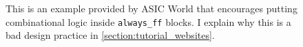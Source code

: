 
\begin{figure}[t]
    \centering
    \caption[
        ASIC World bad example
    ]{
        This is an example provided by ASIC World that encourages putting combinational logic inside \texttt{always_ff} blocks. \cite{asicworld} I explain why this is a bad design practice in \autoref{section:tutorial_websites}.
    }
    \label{fig:asicworld}
\end{figure}
